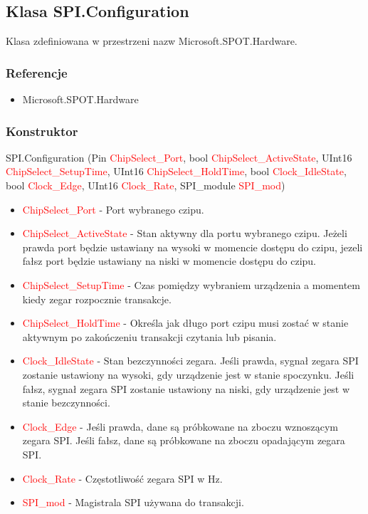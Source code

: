 \documentclass{article}
\begin{document}
\newpage
\subsection{Klasa SPI.Configuration}
Klasa zdefiniowana w przestrzeni nazw Microsoft.SPOT.Hardware. 
\subsubsection{Referencje}
\begin{itemize}
\item Microsoft.SPOT.Hardware
\end{itemize}
\subsubsection{Konstruktor}
SPI.Configuration (Pin \textcolor{red}{ChipSelect\_Port}, bool \textcolor{red}{ChipSelect\_ActiveState}, \newline UInt16 \textcolor{red}{ChipSelect\_SetupTime}, UInt16 \textcolor{red}{ChipSelect\_HoldTime},  bool \textcolor{red}{Clock\_IdleState}, bool \textcolor{red}{Clock\_Edge}, UInt16 \textcolor{red}{Clock\_Rate}, SPI\_module \textcolor{red}{SPI\_mod})
\begin{itemize}
\item \textcolor{red}{ChipSelect\_Port} - Port wybranego czipu.
\item \textcolor{red}{ChipSelect\_ActiveState} - Stan aktywny dla portu wybranego czipu. Jeżeli prawda port będzie ustawiany na wysoki w momencie dostępu do czipu, jezeli fałsz port będzie ustawiany na niski w momencie dostępu do czipu.
\item \textcolor{red}{ChipSelect\_SetupTime} - Czas pomiędzy wybraniem urządzenia a momentem kiedy zegar rozpocznie transakcje. 
\item \textcolor{red}{ChipSelect\_HoldTime} - Określa jak długo port czipu musi zostać w stanie aktywnym po zakończeniu transakcji czytania lub pisania.
\item \textcolor{red}{Clock\_IdleState} - Stan bezczynności zegara. Jeśli prawda, sygnał zegara SPI zostanie ustawiony na wysoki, gdy urządzenie jest w stanie spoczynku. Jeśli fałsz, sygnał zegara SPI zostanie ustawiony na niski, gdy urządzenie jest w stanie bezczynności. 
\item \textcolor{red}{Clock\_Edge} - Jeśli prawda, dane są próbkowane na zboczu wznoszącym zegara SPI. Jeśli fałsz, dane są próbkowane na zboczu opadającym zegara SPI.
\item \textcolor{red}{Clock\_Rate} - Częstotliwość zegara SPI w Hz.
\item \textcolor{red}{SPI\_mod} - Magistrala SPI używana do transakcji.
\end{itemize}
\end{document}
